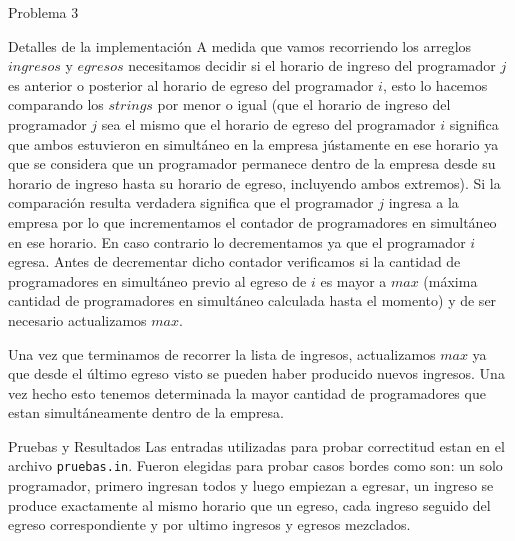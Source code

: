 \begin{section}{Problema 3}
\begin{subsection}{Detalles de la implementación}
	A medida que vamos recorriendo los arreglos $ingresos$ y $egresos$ necesitamos decidir si el horario de ingreso del programador $j$ es anterior o posterior al horario de egreso del programador $i$, esto lo hacemos comparando los $strings$ por menor o igual (que el horario de ingreso del programador $j$ sea el mismo que el horario de egreso del programador $i$ significa que ambos estuvieron en simultáneo en la empresa jústamente en ese horario ya que se considera que un programador permanece dentro de la empresa desde su horario de ingreso hasta su horario de egreso, incluyendo ambos extremos). Si la comparación resulta verdadera significa que el programador $j$ ingresa a la empresa por lo que incrementamos el contador de programadores en simultáneo en ese horario. En caso contrario lo decrementamos ya que el programador $i$ egresa. Antes de decrementar dicho contador verificamos si la cantidad de programadores en simultáneo previo al egreso de $i$ es mayor a $max$ (máxima cantidad de programadores en simultáneo calculada hasta el momento) y de ser necesario actualizamos $max$.

	Una vez que terminamos de recorrer la lista de ingresos, actualizamos $max$ ya que desde el último egreso visto se pueden haber producido nuevos ingresos. Una vez hecho esto tenemos determinada la mayor cantidad de programadores que estan simultáneamente dentro de la empresa.
	\end{subsection}

	\begin{subsection}{Pruebas y Resultados}
	Las entradas utilizadas para probar correctitud estan en el archivo \texttt{pruebas.in}. Fueron elegidas para probar casos bordes como son: un solo programador, primero ingresan todos y luego empiezan a egresar, un ingreso se produce exactamente al mismo horario que un egreso, cada ingreso seguido del egreso correspondiente y por ultimo ingresos y egresos mezclados.


\end{subsection}
\end{section}
